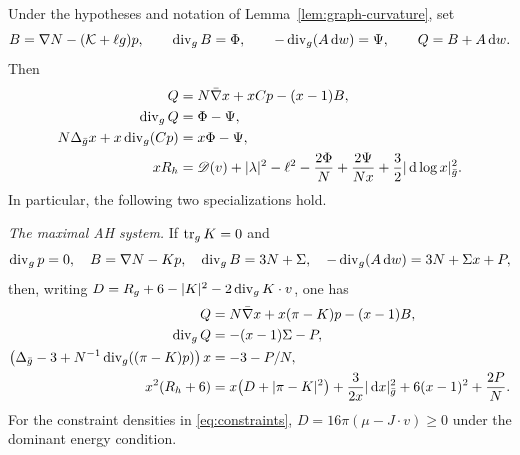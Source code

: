 \begin{lemma}\label{lem:graph-current}
Under the hypotheses and notation of Lemma~\ref{lem:graph-curvature}, set
\begin{equation}
 B=\nabla N-(\mathcal K+\ell g)p,\qquad
 \operatorname{div}_g B=\Phi,\qquad -\operatorname{div}_g(A\mathop{}\!\mathrm d w)=\Psi,
 \qquad Q=B+A\mathop{}\!\mathrm d w.
 \label{eq:calculus-general-system}
\end{equation}
Then
\begin{align}
 Q&=N\bar\nabla x+xCp-(x-1)B,\notag\\
 \operatorname{div}_g Q&=\Phi-\Psi,
 \label{eq:calculus-general-current}\\
 N\Delta_{\bar g}x+x\operatorname{div}_g(Cp)&=x\Phi-\Psi,
 \label{eq:calculus-general-x}\\
 xR_h&=\mathscr D(v)+|\lambda|^2-\ell^2
       -\frac{2\Phi}{N}+\frac{2\Psi}{Nx}
       +\frac32|\mathop{}\!\mathrm d\log x|_{\bar g}^2.
 \label{eq:calculus-general-conformal}
\end{align}
In particular, the following two specializations hold.

\smallskip\noindent
\emph{The maximal AH system.}  If $\operatorname{tr}_gK=0$ and
\begin{equation}
 \operatorname{div}_g p=0,\quad B=\nabla N-Kp,\quad
 \operatorname{div}_g B=3N+\Sigma,\quad
 -\operatorname{div}_g(A\mathop{}\!\mathrm d w)=3N+\Sigma x+P,
 \label{eq:calculus-ah-system}
\end{equation}
then, writing
$D=R_g+6-|K|^2-2\operatorname{div}_gK\cdot v$, one has
\begin{align}
 Q&=N\bar\nabla x+x(\pi-K)p-(x-1)B,\notag\\
 \operatorname{div}_g Q&=-(x-1)\Sigma-P,
 \label{eq:calculus-ah-current}\\
 \left(\Delta_{\bar g}-3+
          N^{-1}\operatorname{div}_g((\pi-K)p)\right)x&=-3-P/N,
 \label{eq:calculus-ah-x}\\
 x^2(R_h+6)
 &=x\bigl(D+|\pi-K|^2\bigr)
   +\frac{3}{2x}|\mathop{}\!\mathrm d x|_{\bar g}^2
   +6(x-1)^2+\frac{2P}{N}.
 \label{eq:calculus-ah-curvature}
\end{align}
For the constraint densities in \eqref{eq:constraints},
$D=16\pi(\mu-J\cdot v)\ge0$ under the dominant energy condition.


\end{lemma}
